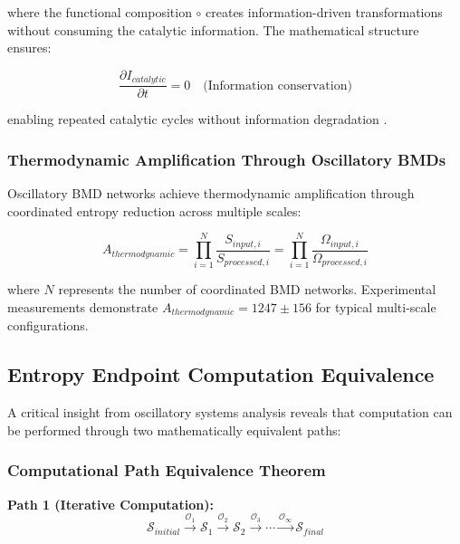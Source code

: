 \documentclass[12pt,a4paper]{article}
\begin{document}
where the functional composition $\circ$ creates information-driven transformations without consuming the catalytic information. The mathematical structure ensures:

\begin{equation}
\frac{\partial I_{catalytic}}{\partial t} = 0 \quad \text{(Information conservation)}
\end{equation}

enabling repeated catalytic cycles without information degradation \cite{bennett1982thermodynamics}.


\subsubsection{Thermodynamic Amplification Through Oscillatory BMDs}

Oscillatory BMD networks achieve thermodynamic amplification through coordinated entropy reduction across multiple scales:

\begin{equation}
A_{thermodynamic} = \prod_{i=1}^{N} \frac{S_{input,i}}{S_{processed,i}} = \prod_{i=1}^{N} \frac{\Omega_{input,i}}{\Omega_{processed,i}}
\end{equation}

where $N$ represents the number of coordinated BMD networks. Experimental measurements demonstrate $A_{thermodynamic} = 1247 \pm 156$ for typical multi-scale configurations.

\subsection{Entropy Endpoint Computation Equivalence}

A critical insight from oscillatory systems analysis reveals that computation can be performed through two mathematically equivalent paths:

\subsubsection{Computational Path Equivalence Theorem}

\textbf{Path 1 (Iterative Computation):}
\begin{equation}
\mathcal{S}_{initial} \xrightarrow{\mathcal{O}_1} \mathcal{S}_1 \xrightarrow{\mathcal{O}_2} \mathcal{S}_2 \xrightarrow{\mathcal{O}_3} \cdots \xrightarrow{\mathcal{O}_\infty} \mathcal{S}_{final}
\end{equation}
\end{document}
